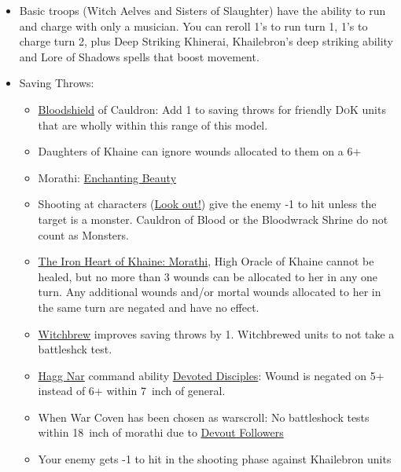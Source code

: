 \begin{itemize}
\item Basic troops (Witch Aelves and Sisters of Slaughter) have the ability to
    run and charge with only a musician.  You can reroll 1's to run turn 1, 1's
        to charge turn 2, plus Deep
        Striking Khinerai, Khailebron's deep striking ability and Lore of
        Shadows spells that boost movement.
\item Saving Throws:
    \begin{itemize}
        \item \hyperref[bloodshield]{Bloodshield} of Cauldron: Add 1 to saving
            throws for friendly \textsc{DoK} units that are wholly within this
            range of this model.
        \item Daughters of Khaine can ignore wounds allocated to them on a 6+
        \item Morathi: \hyperref[enchanting-beauty]{Enchanting Beauty}
        \item  Shooting at characters (\hyperref[corerule:look-out-sir]{Look
            out!}) give the enemy -1 to hit unless the target is a monster.
            Cauldron of Blood  or the Bloodwrack Shrine do not
            count as Monsters. 
        \item \hyperref[the-iron-heart-of-khaine]{The Iron Heart of Khaine:
            Morathi}, High Oracle of Khaine cannot be healed, but no more than
            3 wounds can be allocated to her in any one turn. Any additional
            wounds and/or mortal wounds allocated to her in the same turn are
            negated and have no effect.
        \item \hyperref[witchbrew]{Witchbrew} improves saving throws by 1. Witchbrewed
            units to not take a battleshck test.
        \item \hyperref[hagg-nar]{Hagg Nar} command ability
            \hyperref[devoted-disciples]{Devoted Disciples}: Wound is negated
            on 5+ instead of 6+ within 7~inch of general.
        \item When War Coven has been chosen as warscroll: No battleshock tests
            within 18~inch of morathi due to \hyperref[devout-followers]{Devout
            Followers}
        \item Your enemy gets -1 to hit in the shooting phase against
            Khailebron units
    \end{itemize}
\end{itemize}

